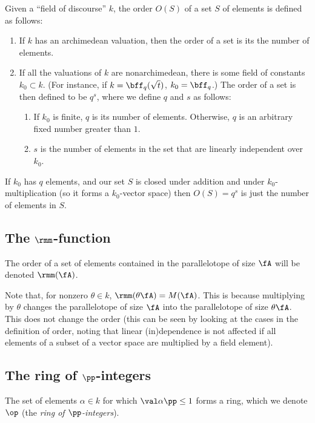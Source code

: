 \begin{defn}
  Given a ``field of discourse'' $k$, the order $O(S)$ of a set $S$ of elements
  is defined as follows:
  \begin{enumerate}
  \item If $k$ has an archimedean valuation, then the order of a set is its the
    number of elements.
  \item If all the valuations of $k$ are nonarchimedean, there is some field of
    constants $k_0 \subset k$. (For instance, if $k = \bff_q(\sqrt t)$, $k_0 =
    \bff_q$.) The order of a set is then defined to be $q^s$, where we define
    $q$ and $s$ as follows:
    \begin{enumerate}
    \item If $k_0$ is finite, $q$ is its number of elements. Otherwise, $q$ is
      an arbitrary fixed number greater than $1$.
    \item $s$ is the number of elements in the set that are linearly independent
      over $k_0$.
    \end{enumerate}
  \end{enumerate}
\end{defn}

If $k_0$ has $q$ elements, and our set $S$ is closed under addition and under
$k_0$-multiplication (so it forms a $k_0$-vector space) then $O(S) = q^s$ is
just the number of elements in $S$.

\subsection{The $\rmm$-function}
\label{subsec:mfunction}
The order of a set of elements contained in the parallelotope of size $\fA$ will
be denoted $\rmm(\fA)$.

Note that, for nonzero $\theta\in k$, $\rmm(\theta\fA)=M(\fA)$. This is because
multiplying by $\theta$ changes the parallelotope of size $\fA$ into the
parallelotope of size $\theta\fA$. This does not change the order (this can be
seen by looking at the cases in the definition of order, noting that linear
(in)dependence is not affected if all elements of a subset of a vector space are
multiplied by a field element).

\subsection{The ring of $\pp$-integers}
\label{subsec:ring-of-integers}
The set of elements $\alpha\in k$ for which $\val\alpha\pp \leq 1$ forms a
ring, which we denote $\op$ (the \textit{ring of $\pp$-integers}).

